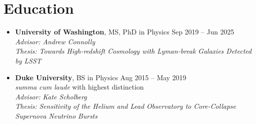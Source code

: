 \section{Education}

\begin{itemize}[itemsep=0.5em]
    \item \textbf{University of Washington}, MS, PhD in Physics
    \hfill Sep 2019 -- Jun 2025 \\
    \textit{Advisor: Andrew Connolly} \\
    \textit{Thesis: Towards High-redshift Cosmology with Lyman-break Galaxies Detected by LSST}

    \item \textbf{Duke University}, BS in Physics
    \hfill Aug 2015 -- May 2019 \\
    \textit{summa cum laude} with highest distinction \\
    \textit{Advisor: Kate Scholberg} \\
    \textit{Thesis: Sensitivity of the Helium and Lead Observatory to Core-Collapse Supernova Neutrino Bursts}
\end{itemize}